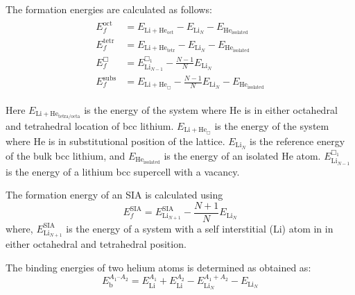 The formation energies are calculated as follows:
\begin{align}\label{eq_forme}
\begin{split}
 E_{f}^{\text{oct}} & = E_{\text{Li}+\text{He}_{\text{oct}}} - E_{\text{Li}_N} - E_{\text{He}_{\text{isolated}}} \\
 E_{f}^{\text{tetr}}& = E_{\text{Li}+\text{He}_{\text{tetr}}} - E_{\text{Li}_N} - E_{\text{He}_{\text{isolated}}} \\
 E_f^{\Box} & = E^{{\Box}_1}_{\text{Li}_{N-1}} - \frac{N-1}{N} E_{\text{Li}_N} \\
 E_f^{\text{subs}} & = E_{\text{Li}+\text{He}_{\Box}} - \frac{N-1}{N} E_{\text{Li}_N} - E_{\text{He}_{\text{isolated}}}
\end{split}
 \end{align}




Here $E_{\text{Li}+\text{He}_{\text{tetra/octa}}}$ is the energy of the system where He is in either octahedral and tetrahedral location of bcc lithium. $E_{\text{Li}+\text{He}_{\Box}}$ is the energy of the system where He is in substitutional position of the lattice. $E_{\text{Li}_N}$ is the reference energy of the bulk bcc lithium, and $E_{\text{He}_{\text{isolated}}}$ is the energy of an isolated He atom. $E^{\Box_1}_{\text{Li}_{N-1}}$ is the energy of a lithium bcc supercell with a vacancy.


The formation energy of an SIA is calculated using
\begin{equation}
E_f^{\text{SIA}} = E_{\text{Li}_{N+1}}^{\text{SIA}} - \frac{N+1}{N} E_{\text{Li}_N}
\end{equation}
where, $E^{\text{SIA}}_{\text{Li}_{N+1}}$ is the energy of a system with a self interstitial (Li) atom in in either octahedral and tetrahedral position.


The binding energies of two helium atoms is determined as obtained as: 
\begin{equation}
E_{\text{b}}^{A_1\text{--}A_2} = E_{\text{Li}}^{A_1} + E_{\text{Li}}^{A_2} - E_{\text{Li}_N}^{A_1+A_2} - E_{\text{Li}_N} 
\end{equation}

